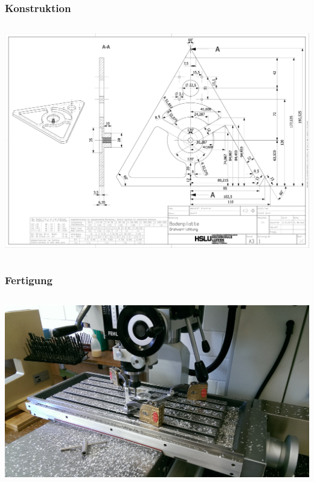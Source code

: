 \begin{frame}
    \frametitle{Konstruktion}
    \begin{columns}
        \begin{column}{1\textwidth}
            \centering
            \includegraphics[width=1.0\textwidth]{FotosM/Bild1.pdf}
        \end{column}
    \end{columns}
\end{frame}
\begin{frame}
    \frametitle{Fertigung}
    \begin{columns}
        \begin{column}{0.9\textwidth}
            \centering
            \includegraphics[width=1.0\textwidth]{FotosM/Bild2.jpg}
        \end{column}
    \end{columns}
\end{frame}
